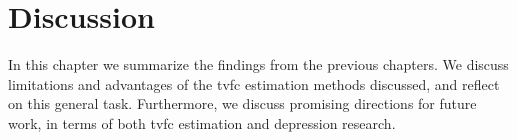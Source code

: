 \chapter{Discussion}
\label{ch:discussion}

In this chapter we summarize the findings from the previous chapters.
We discuss limitations and advantages of the \gls{tvfc} estimation methods discussed, and reflect on this general task.
Furthermore, we discuss promising directions for future work, in terms of both \gls{tvfc} estimation and depression research.
